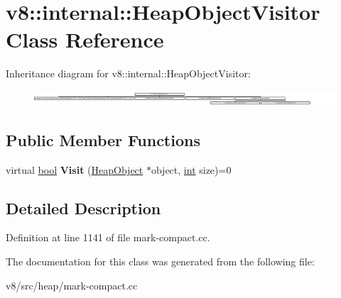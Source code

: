\hypertarget{classv8_1_1internal_1_1HeapObjectVisitor}{}\section{v8\+:\+:internal\+:\+:Heap\+Object\+Visitor Class Reference}
\label{classv8_1_1internal_1_1HeapObjectVisitor}
Inheritance diagram for v8\+:\+:internal\+:\+:Heap\+Object\+Visitor\+:\begin{figure}[H]
\begin{center}
\leavevmode
\includegraphics[height=0.551181cm]{classv8_1_1internal_1_1HeapObjectVisitor}
\end{center}
\end{figure}
\subsection*{Public Member Functions}
\begin{DoxyCompactItemize}
\item 
\mbox{\label{classv8_1_1internal_1_1HeapObjectVisitor_af4a63c24943db228dda8e4cf8f04968b}} 
virtual \mbox{\hyperlink{classbool}{bool}} {\bfseries Visit} (\mbox{\hyperlink{classv8_1_1internal_1_1HeapObject}{Heap\+Object}} $\ast$object, \mbox{\hyperlink{classint}{int}} size)=0
\end{DoxyCompactItemize}


\subsection{Detailed Description}


Definition at line 1141 of file mark-\/compact.\+cc.



The documentation for this class was generated from the following file\+:\begin{DoxyCompactItemize}
\item 
v8/src/heap/mark-\/compact.\+cc\end{DoxyCompactItemize}

